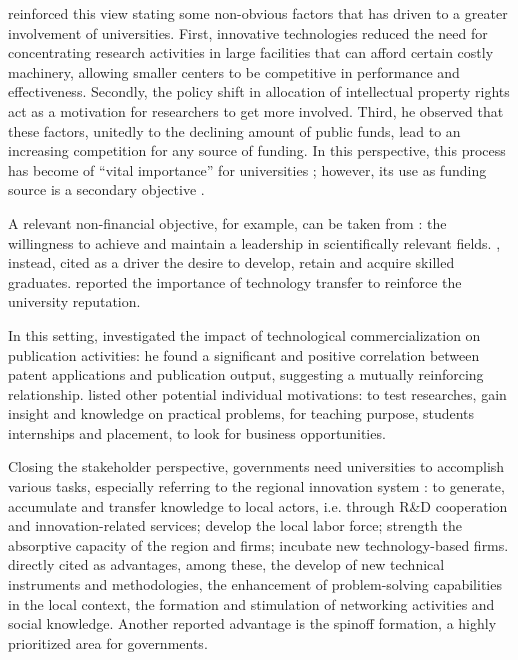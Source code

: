 \citet{Baldini2007} reinforced this view stating some non-obvious factors that has driven to a greater involvement of universities. First, innovative technologies reduced the need for concentrating research activities in large facilities that can afford certain costly machinery, allowing smaller centers to be competitive in performance and effectiveness. Secondly, the policy shift in allocation of intellectual property rights act as a motivation for researchers to get more involved. Third, he observed that these factors, unitedly to the declining amount of public funds, lead to an increasing competition for any source of funding. In this perspective, this process has become of \enquote{vital importance} for universities \citep{Muscio2008}; however, its use as funding source is a secondary objective \citep{Jensen1998}.

A relevant non-financial objective, for example, can be taken from \citet{Tijssen2006}: the willingness to achieve and maintain a leadership in scientifically relevant fields. \citet{Leitch2005}, instead, cited as a driver the desire to develop, retain and acquire skilled graduates. \citet{Baldini2006} reported the importance of technology transfer to reinforce the university reputation. 

In this setting, \citet{Wong2010} investigated the impact of technological commercialization on publication activities: he found a significant and positive correlation between patent applications and publication output, suggesting a mutually reinforcing relationship. \citet{Lee2000} listed other potential individual motivations: to test researches, gain insight and knowledge on practical problems, for teaching purpose, students internships and placement, to look for business opportunities. 

Closing the stakeholder perspective, governments need universities to accomplish various tasks, especially referring to the regional innovation system \citep{Fritsch2007,Balderi2007}: to generate, accumulate and transfer knowledge to local actors, i.e. through R\&D cooperation and innovation-related services; develop the local labor force; strength the absorptive capacity of the region and firms; incubate new technology-based firms. \citet{AzagraCaro2010} directly cited as advantages, among these, the develop of new technical instruments and methodologies, the enhancement of problem-solving capabilities in the local context, the formation and stimulation of networking activities and social knowledge. Another reported advantage is the spinoff formation, a highly prioritized area for governments.

